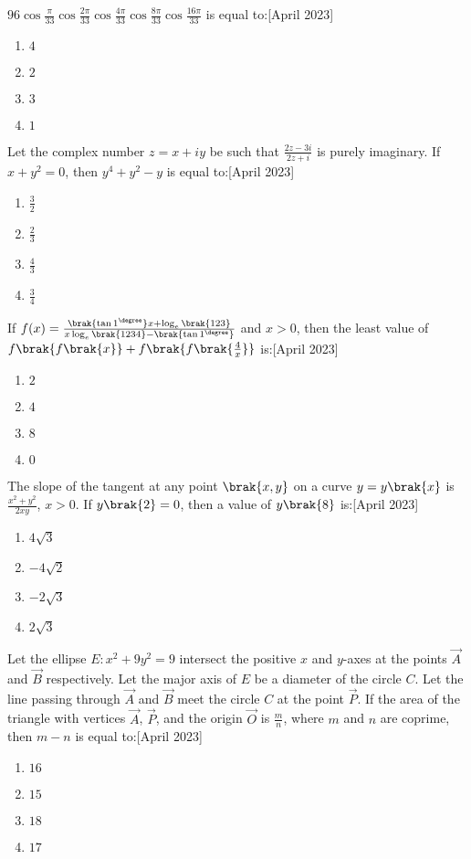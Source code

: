 \iffalse
\title{2023}
\author{ee24btech11009}
\section{mcq-single}
\fi
\item $96\cos \frac{\pi}{33} \cos\frac{2\pi}{33} \cos\frac{4\pi}{33} \cos\frac{8\pi}{33} \cos\frac{16\pi}{33}$
is equal to:\hfill{[April 2023]}
\begin{enumerate}
    \item $4$
    \item $2$
    \item $3$
    \item $1$
\end{enumerate}
\item Let the complex number $z = x + iy$ be such that 
$\frac{2z - 3i}{2z + i}$ is purely imaginary. If $x + y^2 = 0$, then $y^4 + y^2 - y$ is equal to:\hfill{[April 2023]}
\begin{enumerate}
    \item $\frac{3}{2}$
    \item $\frac{2}{3}$
    \item $\frac{4}{3}$
    \item $\frac{3}{4}$
\end{enumerate}
\item If $f(x) = \frac{\brak{\tan 1^{\degree}} x + \log_e{\brak{123}}}{x \log_e{\brak{1234}}-\brak{\tan 1^{\degree}}}$ and $x > 0$, then the least value of 
$f\brak{f\brak{x}} + f\brak{f\brak{\frac{4}{x}}}$ is:\hfill{[April 2023]}
\begin{enumerate}
    \item $2$
    \item $4$
    \item $8$
    \item $0$
\end{enumerate}
\item The slope of the tangent at any point $\brak{x, y}$ on a curve $y = y\brak{x}$ is 
$\frac{x^2 + y^2}{2xy}$, $x > 0$. If $y\brak{2} = 0$, then a value of $y\brak{8}$ is:\hfill{[April 2023]}
\begin{enumerate}
    \item $4\sqrt{3}$
    \item $-4\sqrt{2}$
    \item $-2\sqrt{3}$
    \item $2\sqrt{3}$
\end{enumerate}
\item Let the ellipse $E: x^2 + 9y^2 = 9$ intersect the positive $x$ and $y$-axes at the points $\vec{A}$ and $\vec{B}$ respectively. Let the major axis of $E$ be a diameter of the circle $C$. Let the line passing through $\vec{A}$ and $\vec{B}$ meet the circle $C$ at the point $\vec{P}$. If the area of the triangle with vertices $\vec{A}$, $\vec{P}$, and the origin $\vec{O}$ is $\frac{m}{n}$, where $m$ and $n$ are coprime, then $m - n$ is equal to:\hfill{[April 2023]}
\begin{enumerate}
    \item $16$
    \item $15$
    \item $18$
    \item $17$
\end{enumerate}

